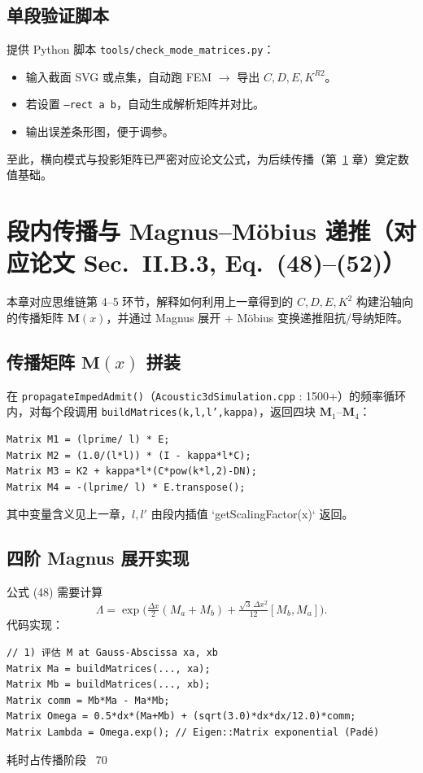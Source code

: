\documentclass{ctexart}
\begin{document}
\subsection{单段验证脚本}
提供 Python 脚本 \texttt{tools/check\_mode\_matrices.py}：
\begin{itemize}
    \item 输入截面 SVG 或点集，自动跑 FEM $\rightarrow$ 导出 $C,D,E,K^{R2}$。
    \item 若设置 \texttt{--rect a b}，自动生成解析矩阵并对比。
    \item 输出误差条形图，便于调参。
\end{itemize}

\vspace{0.5em}
至此，横向模式与投影矩阵已严密对应论文公式，为后续传播（第~\ref{sec:propagate} 章）奠定数值基础。

\section{段内传播与 Magnus--Möbius 递推（对应论文 Sec.~II.B.3, Eq.~(48)--(52)）}
\label{sec:propagate}
本章对应思维链第 4–5 环节，解释如何利用上一章得到的 $C,D,E,K^{2}$ 构建沿轴向的传播矩阵 $\mathbf M(x)$，并通过 Magnus 展开 + Möbius 变换递推阻抗/导纳矩阵。

\subsection{传播矩阵 $\mathbf M(x)$ 拼装}
在 \texttt{propagateImpedAdmit()}（\texttt{Acoustic3dSimulation.cpp} : 1500+）的频率循环内，对每个段调用
\texttt{buildMatrices(k,l,l',kappa)}，返回四块
$\mathbf M_1$--$\mathbf M_4$：
\begin{lstlisting}[caption={片段：构建 M 子块},label={lst:Mbuild}]
Matrix M1 = (lprime/ l) * E;
Matrix M2 = (1.0/(l*l)) * (I - kappa*l*C);
Matrix M3 = K2 + kappa*l*(C*pow(k*l,2)-DN);
Matrix M4 = -(lprime/ l) * E.transpose();
\end{lstlisting}
其中变量含义见上一章，$l,l'$ 由段内插值 `getScalingFactor(x)` 返回。

\subsection{四阶 Magnus 展开实现}
公式 (48) 需要计算
\[\Lambda=\exp\bigl(\tfrac{\Delta x}{2}(M_a+M_b)+\tfrac{\sqrt3\,\Delta x^2}{12}[M_b,M_a]\bigr).
\]
代码实现：
\begin{lstlisting}[caption={matrixExp.magnus4()},label={lst:magnus4}]
// 1) 评估 M at Gauss-Abscissa xa, xb
Matrix Ma = buildMatrices(..., xa);
Matrix Mb = buildMatrices(..., xb);
Matrix comm = Mb*Ma - Ma*Mb;
Matrix Omega = 0.5*dx*(Ma+Mb) + (sqrt(3.0)*dx*dx/12.0)*comm;
Matrix Lambda = Omega.exp(); // Eigen::Matrix exponential (Padé)
\end{lstlisting}
耗时占传播阶段 ~70%
\end{document}
